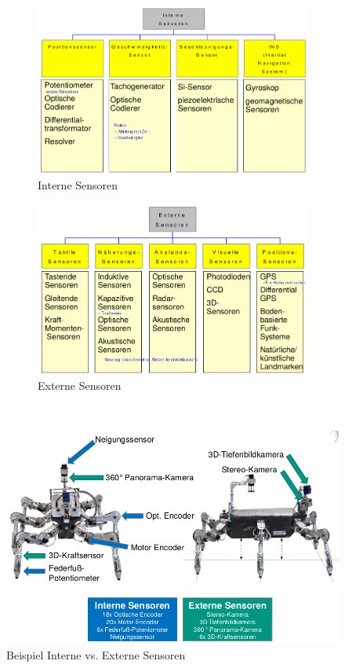 \begin{figure}[h!]
	\begin{subfigure}{.5\textwidth}
		\includegraphics[width=\linewidth]{figures/ch04_intern.png}
		\caption{Interne Sensoren}
	\end{subfigure}
	\begin{subfigure}{.5\textwidth}
		\includegraphics[width=\linewidth]{figures/ch04_extern.png}
		\caption{Externe Sensoren}
	\end{subfigure}
	\caption{}
	\label{intext}
\end{figure}\\
\begin{figure}[h!]
	\centering
	\includegraphics[width=0.5\linewidth]{figures/ch04_intext.png}
	\caption{Beispiel Interne vs. Externe Sensoren}
	\label{intextbsp}
\end{figure}
